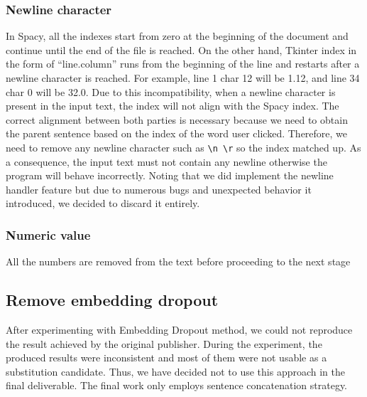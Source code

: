 \documentclass[12pt,oneside,openright,a4paper]{cpe-english-project}
\begin{document}
\subsubsection{Newline character}
In Spacy, all the indexes start from zero at the beginning of the document and continue until the end of the file is reached. On the other hand, Tkinter index in the form of “line.column” runs from the beginning of the line and restarts after a newline character is reached. For example, line 1 char 12 will be 1.12, and line 34 char 0 will be 32.0. Due to this incompatibility, when a newline character is present in the input text, the index will not align with the Spacy index. The correct alignment between both parties is necessary because we need to obtain the parent sentence based on the index of the word user clicked. Therefore, we need to remove any newline character such as \verb/\n \r/ so the index matched up. As a consequence, the input text must not contain any newline otherwise the program will behave incorrectly.
Noting that we did implement the newline handler feature but due to numerous bugs and unexpected behavior it introduced, we decided to discard it entirely.
\subsubsection{Numeric value}
All the numbers are removed from the text before proceeding to the next stage

\subsection{Remove embedding dropout}
After experimenting with Embedding Dropout method, we could not reproduce the result achieved by the original publisher. During the experiment, the produced results were inconsistent and most of them were not usable as a substitution candidate. Thus, we have decided not to use this approach in the final deliverable. The final work only employs sentence concatenation strategy.
\end{document}
